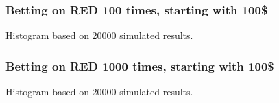 \documentclass[handout]{beamer}
\begin{document}


   \begin{frame}
   \frametitle{Betting on {\color{red} RED} 100 times, starting with 100\$}
   \begin{center}
   \end{center}
   Histogram based on 20000 simulated results.
   \end{frame}



   \begin{frame}
   \frametitle{Betting on {\color{red} RED} 1000 times, starting with 100\$}
   \begin{center}
   \end{center}
   Histogram based on 20000 simulated results.
   \end{frame}

\end{document}
